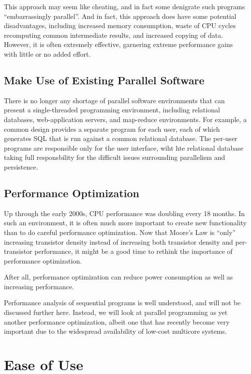This approach may seem like cheating, and in fact some denigrate such
programs ``embarrassingly parallel''.
And in fact, this approach does have some potential disadvantages,
including increased memory consumption, waste of CPU cycles recomputing
common intermediate results, and increased copying of data.
However, it is often  extremely effective, garnering extreme performance
gains with little or no added effort.

\subsection{Make Use of Existing Parallel Software}
\label{sec:intro:Make Use of Existing Parallel Software}

There is no longer any shortage of parallel software environments that
can present a single-threaded programming environment,
including relational
databases, web-application servers, and map-reduce environments.
For example, a common design provides a separate program for each
user, each of which generates SQL that is run against a common
relational database.
The per-user programs are responsible only for the user interface,
wiht hte relational database taking full responsbility for the
difficult issues surrounding parallelism and persistence.

\subsection{Performance Optimization}
\label{sec:intro:Performance Optimization}

Up through the early 2000s, CPU performance was doubling every 18 months.
In such an environment, it is often much more important to create new
functionality than to do careful performance optimization.
Now that Moore's Law is ``only'' increasing transistor density instead
of increasing both transistor density and per-transistor performance,
it might be a good time to rethink the importance of performance
optimization.

After all, performance optimization can reduce power consumption as
well as increasing performance.

Performance analysis of sequential programs is well understood,
and will not be discussed further here.
Instead, we will look at parallel programming as yet another performance
optimization, albeit one that has recently become very important due
to the widespread availability of low-cost multicore systems.

\section{Ease of Use}
\label{sec:intro:Ease of Use}

